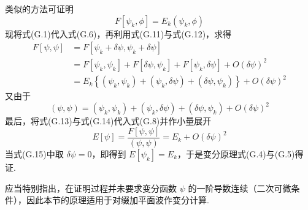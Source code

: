 类似的方法可证明
\begin{equation}
  F[\psi_{k},\phi]=E_{k}\left(\psi_{k},\phi\right)
\end{equation}
现将式(G.1)代入式(G.6)，再利用式(G.11)与式(G.12)，求得
\begin{equation}
\begin{aligned}
  F[\psi,\psi]
  &=F[\psi_{k}+\delta\psi,\psi_{k}+\delta\psi]\\
  &=F[\psi_{k},\psi_{k}]+F[\delta\psi,\psi_{k}]
  +F[\psi_{k},\delta\psi]+O\left(\delta\psi\right)^{2}\\
  &=E_{k}\left\{(\psi_{k},\psi_{k})+(\psi_{k},\delta\psi)
  +(\delta\psi,\psi_{k})\right\}
  +O\left(\delta\psi\right)^{2}
\end{aligned}
\end{equation}
又由于
\begin{equation}
  (\psi,\psi)=(\psi_{k},\psi_{k})+(\psi_{k},\delta\psi)
  +(\delta\psi,\psi_{k})+O\left(\delta\psi\right)^{2}
\end{equation}
最后，将式(G.13)与式(G.14)代入式(G.8)并作小量展开
\begin{equation}
  E[\psi]=\frac{F[\psi,\psi]}{(\psi,\psi)}
  =E_{k}+O\left(\delta\psi\right)^{2}
\end{equation}
当式(G.15)中取 $\delta\psi=0$，即得到 $E[\psi_{k}]=E_{k}$，于是变分原理式(G.4)与(G.5)得证.

应当特别指出，在证明过程并未要求变分函数 $\psi$ 的一阶导数连续（二次可微条件），因此本节的原理适用于对缀加平面波作变分计算.
